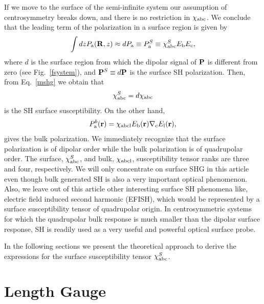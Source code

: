 \documentclass[floatfix,prb,aps,superscriptaddress,11pt,preprint,letterpaper]{revtex4}
\begin{document}
If we move to the surface of the semi-infinite system our assumption 
of centrosymmetry breaks down, and there is no restriction in 
$\chi_{\mathrm{a}\mathrm{b}\mathrm{c}}$. We conclude that the leading term
of the polarization in a surface region is given by
\begin{align}\label{sshgp1}
\int dz 
P_{\mathrm{a}}(\mathbf{R},z)
\approx dP_{\mathrm{a}}
\equiv
P_{\mathrm{a}}^S
\equiv
\chi^S_{\mathrm{a}\mathrm{b}\mathrm{c}}E_{\mathrm{b}}E_{\mathrm{c}},
\end{align}
where
$d$ is the
surface region from which the dipolar signal of $\mathbf{P}$ is
different from zero (see Fig.~\ref{fsystem}), and
$\mathbf{P}^S\equiv d\mathbf{P}$
 is the surface SH polarization. Then, from Eq.~\eqref{mshg} we obtain that
\begin{align}\label{sshgp2}
\chi_{\mathrm{a}\mathrm{b}\mathrm{c}}^S=d\chi_{\mathrm{a}\mathrm{b}\mathrm{c}}
\end{align}
is the
SH surface susceptibility. 
On the other hand, 
\begin{equation}\label{sshgp3}
P^b_{\mathrm{a}}(\mathbf{r})=\chi_{\mathrm{a}\mathrm{b}\mathrm{c}\mathrm{l}}E_{\mathrm{b}}(\mathbf{r})\nabla_{\mathrm{c}}
E_{\mathrm{l}}(\mathbf{r}),  
\end{equation}
gives the bulk polarization. We immediately recognize that the surface
polarization is of dipolar order while the bulk polarization is of
quadrupolar order. The surface, $\chi^S_{\mathrm{a}\mathrm{b}\mathrm{c}}$, and bulk, 
$\chi_{\mathrm{a}\mathrm{b}\mathrm{c}\mathrm{l}}$, susceptibility tensor ranks are three and 
four, respectively. We will only concentrate on surface SHG in this article 
even though bulk generated SH is also a very important optical phenomenon. 
Also, we leave out of this article other interesting surface SH phenomena like, electric field
induced second harmonic (EFISH), which would be represented by a
surface susceptibility  tensor of quadrupolar origin.
In centrosymmetric systems for which the quadrupolar bulk
response is much smaller than the dipolar surface response, SH is
readily used as a very useful and powerful 
optical surface probe.\cite{downer_optical_2001}

In the following sections we present the theoretical approach to
derive
the expressions for the 
surface susceptibility tensor $\chi^S_{\mathrm{a}\mathrm{b}\mathrm{c}}$.

\section{Length Gauge}\label{longi}
\end{document}
